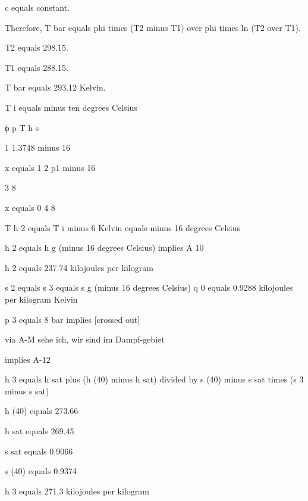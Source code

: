 c equals constant.

Therefore, T bar equals phi times (T2 minus T1) over phi times ln (T2 over T1).

T2 equals 298.15.

T1 equals 288.15.

T bar equals 293.12 Kelvin.

T i equals minus ten degrees Celsius

ϕ p T h s

1 1.3748 minus 16

x equals 1 2 p1 minus 16

3 8

x equals 0 4 8

T h 2 equals T i minus 6 Kelvin equals minus 16 degrees Celsius

h 2 equals h g (minus 16 degrees Celsius) implies A 10

h 2 equals 237.74 kilojoules per kilogram

s 2 equals s 3 equals s g (minus 16 degrees Celsius) q 0 equals 0.9288 kilojoules per kilogram Kelvin

p 3 equals 8 bar implies [crossed out]

via A-M sehe ich, wir sind im Dampf-gebiet

implies A-12

h 3 equals h sat plus (h (40) minus h sat) divided by s (40) minus s sat times (s 3 minus s sat)

h (40) equals 273.66

h sat equals 269.45

s sat equals 0.9066

s (40) equals 0.9374

h 3 equals 271.3 kilojoules per kilogram